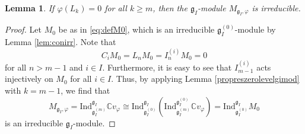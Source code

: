 \documentclass[12pt, reqno]{amsart}
\numberwithin{equation}{section}
\newtheorem{lemma}[theorem]{Lemma}%
\numberwithin{equation}{section}
\def\g{\mathfrak{g}}
\def\vf{\varphi}
\def\vvf{v_{\vf}}
\def\gi{\g_I}
\def\gizero{\gi^{(0)}}
\def\gim{\gi^{(m)}}
\def\mgivf{M_{\gi,\vf}}
\newcommand{\C}{\mathbb C}
\def\Ind{\mathrm{Ind}}
\begin{document}
\begin{lemma}\label{lem:globalconirr}
 If $\varphi(L_k)=0$ for all $k\ge m$,  then the $\g_I$-module $M_{\g_I,\varphi}$ is irreducible.
\end{lemma}
\begin{proof}
Let $M_0$ be as in \eqref{eq:defM0}, which is an irreducible $\g_I^{(0)}$-module by Lemma \ref{lem:conirr}.
Note that
\[C_iM_0=L_nM_0=I_n^{(i)}M_0=0\]
for all $n>m-1$ and $i\in I$. Furthermore, it is easy to see that $I_{m-1}^{(i)}$ acts injectively on $M_0$ for all $i\in I$.
  Thus, by applying Lemma \ref{propreszerolevelgimod} with $k=m-1$, we find that
$$\mgivf=\Ind_{\gim}^{\gi}\C\vvf\cong\Ind_{\gizero}^{\gi}\left(\Ind_{\gim}^{\gizero}\C\vvf\right)
   =\Ind_{\gizero}^{\gi}M_0$$
 is an irreducible $\gi$-module.
\end{proof}
\end{document}
